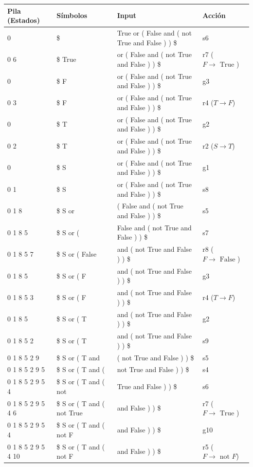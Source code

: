 \documentclass[12pt, letterpaper]{article}
\begin{document}
\begin{enumerate}
\begingroup\footnotesize
\begin{longtable}{p{3.6cm}p{4.0cm}p{4.5cm}>{\raggedright\arraybackslash}p{3.6cm}}
\toprule
\textbf{Pila (Estados)} & \textbf{Símbolos} & \textbf{Input} & \textbf{Acción} \\
\midrule
\endhead
0 & \$ & True or ( False and ( not True and False ) ) \$ & s6 \\
0 6 & \$ True & or ( False and ( not True and False ) ) \$ & r7 ($F \to \text{ True }$) \\
0 & \$ F & or ( False and ( not True and False ) ) \$ & g3 \\
0 3 & \$ F & or ( False and ( not True and False ) ) \$ & r4 ($T \to F$) \\
0 & \$ T & or ( False and ( not True and False ) ) \$ & g2 \\
0 2 & \$ T & or ( False and ( not True and False ) ) \$ & r2 ($S \to T$) \\
0 & \$ S & or ( False and ( not True and False ) ) \$ & g1 \\
0 1 & \$ S & or ( False and ( not True and False ) ) \$ & s8 \\
0 1 8 & \$ S or & ( False and ( not True and False ) ) \$ & s5 \\
0 1 8 5 & \$ S or ( & False and ( not True and False ) ) \$ & s7 \\
0 1 8 5 7 & \$ S or ( False & and ( not True and False ) ) \$ & r8 ($F \to \text{ False }$) \\
0 1 8 5 & \$ S or ( F & and ( not True and False ) ) \$ & g3 \\
0 1 8 5 3 & \$ S or ( F & and ( not True and False ) ) \$ & r4 ($T \to F$) \\
0 1 8 5 & \$ S or ( T & and ( not True and False ) ) \$ & g2 \\
0 1 8 5 2 & \$ S or ( T & and ( not True and False ) ) \$ & s9 \\
0 1 8 5 2 9 & \$ S or ( T and & ( not True and False ) ) \$ & s5 \\
0 1 8 5 2 9 5 & \$ S or ( T and ( & not True and False ) ) \$ & s4 \\
0 1 8 5 2 9 5 4 & \$ S or ( T and ( not & True and False ) ) \$ & s6 \\
0 1 8 5 2 9 5 4 6 & \$ S or ( T and ( not True & and False ) ) \$ & r7 ($F \to \text{ True }$) \\
0 1 8 5 2 9 5 4 & \$ S or ( T and ( not F & and False ) ) \$ & g10 \\
0 1 8 5 2 9 5 4 10 & \$ S or ( T and ( not F & and False ) ) \$ & r5 ($F \to \text{ not } F$) \\

\end{longtable}
\end{enumerate}
\end{document}
